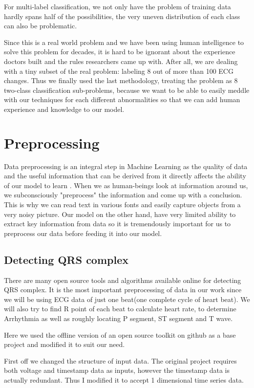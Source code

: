 \documentclass[%
 reprint,
 amsmath,amssymb,
 aps,
]{revtex4-2}
\begin{document}
For multi-label classification, we not only have the problem of training data hardly spans half of the possibilities, the very uneven distribution of each class can also be problematic. 

Since this is a real world problem and we have been using human intelligence to solve this problem for decades, it is hard to be ignorant about the experience doctors built and the rules researchers came up with. After all, we are dealing with a tiny subset of the real problem: labeling 8 out of more than 100 ECG changes\cite{litfl}. Thus we finally used the last methodology, treating the problem as 8 two-class classification sub-problems, because we want to be able to easily meddle with our techniques for each different abnormalities so that we can add human experience and knowledge to our model.

\section{Preprocessing}
Data preprocessing is an integral step in Machine Learning as the quality of data and the useful information that can be derived from it directly affects the ability of our model to learn \cite{Dhairya}. When we as human-beings look at information around us, we subconsciously "preprocess" the information and come up with a conclusion. This is why we can read text in various fonts and easily capture objects from a very noisy picture. Our model on the other hand, have very limited ability to extract key information from data so it is tremendously important for us to preprocess our data before feeding it into our model.

\subsection{Detecting QRS complex}
There are many open source tools and algorithms available online for detecting QRS complex. It is the most important preprocessing of data in our work since we will be using ECG data of just one beat(one complete cycle of heart beat). We will also try to find R point of each beat to calculate heart rate, to determine Arrhythmia as well as roughly locating P segment, ST segment and T wave. 

Here we used the offline version of an open source toolkit on github \cite{Sznajder} as a base project and modified it to suit our need. 

First off we changed the structure of input data. The original project requires both voltage and timestamp data as inputs, however the timestamp data is actually redundant. Thus I modified it to accept 1 dimensional time series data.
\end{document}
